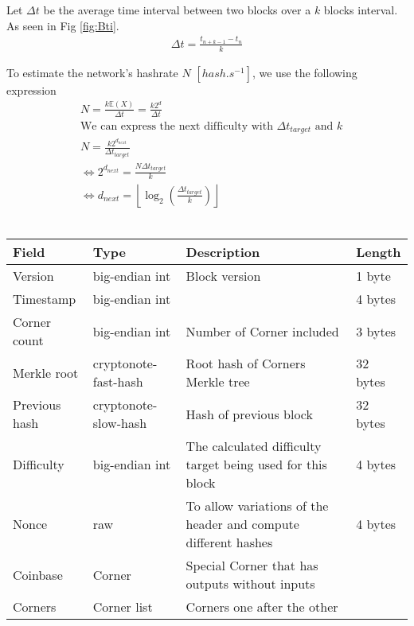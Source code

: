 \documentclass[a4paper,10pt]{article}
\begin{document}
            Let $\Delta t$ be the average time interval between two blocks over a $k$ blocks interval.
            As seen in Fig \ref{fig:Bti}.
            \begin {align*}
             \Delta t = \frac{t_{n+k-1} - t_n}{k}
            \end {align*}

            
            To estimate the network's hashrate $N$ $[hash.s^{-1}]$, we use the following expression\\
            
            
            \begin {align*}
                &\text{}N = \frac{k\mathbb{E}(X)}{\Delta t} = \frac{k2^d}{\Delta t}\\
                &\text{We can express the next difficulty with ${\Delta t}_{target}$ and $k$}\\
                &N = \frac{k2^{d_{next}}}{{\Delta t}_{target}}\\
                &\Leftrightarrow 2^{d_{next}} = \frac{N{\Delta t}_{target}}{k}\\
                &\Leftrightarrow d_{next} = \left\lfloor\log_2\left(\frac{{\Delta t}_{target}}{k}\right)\right\rfloor
            \end {align*}\\
            
            
            \noindent\begin{tabularx}{\textwidth}{|l|l|X|l|}
            \hline Field & Type & Description & Length \\ \hline
            \hline Version & big-endian int & Block version & 1 byte \\
            \hline Timestamp & big-endian int & & 4 bytes\\
            \hline Corner count & big-endian int & Number of Corner included & 3 bytes\\
            \hline Merkle root & cryptonote-fast-hash & Root hash of Corners Merkle tree & 32 bytes\\
            \hline Previous hash & cryptonote-slow-hash & Hash of previous block & 32 bytes\\
            \hline Difficulty & big-endian int & The calculated difficulty target being used for this block & 4 bytes\\
            \hline Nonce & raw & To allow variations of the header and compute different hashes & 4 bytes \\
            \hline
            \hline Coinbase & Corner & Special Corner that has outputs without inputs & \\
            \hline Corners & Corner list & Corners one after the other & \\
            \hline
            \end{tabularx}
        
\end{document}
